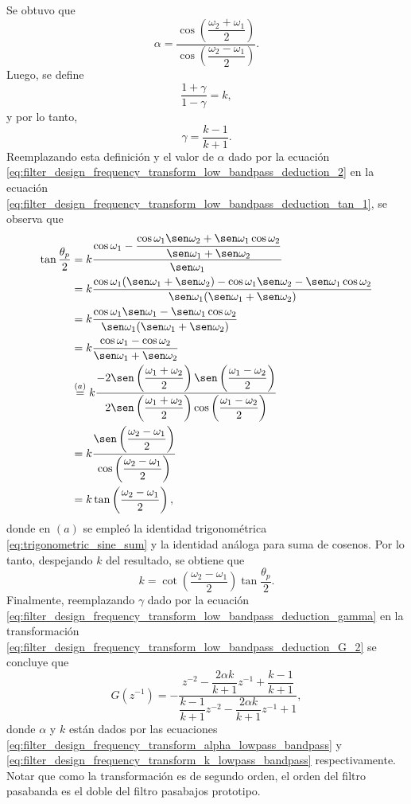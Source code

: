 \documentclass[a4paper]{report}
\begin{document}
Se obtuvo que
\begin{equation}\label{eq:filter_design_frequency_transform_alpha_lowpass_bandpass}
 \alpha=\dfrac{\cos\left(\dfrac{\omega_2+\omega_1}{2}\right)}{\cos\left(\dfrac{\omega_2-\omega_1}{2}\right)}. 
\end{equation}
Luego, se define
\[
 \frac{1+\gamma}{1-\gamma}=k,
\]
y por lo tanto,
\begin{equation}\label{eq:filter_design_frequency_transform_low_bandpass_deduction_gamma}
 \gamma=\frac{k-1}{k+1}. 
\end{equation}
Reemplazando esta definición y el valor de \(\alpha\) dado por la ecuación \ref{eq:filter_design_frequency_transform_low_bandpass_deduction_2} en la ecuación \ref{eq:filter_design_frequency_transform_low_bandpass_deduction_tan_1}, se observa que
\begin{align*}
 \tan\frac{\theta_p}{2}&=k\dfrac{\cos\omega_1-\dfrac{\cos\omega_1\sen\omega_2+\sen\omega_1\cos\omega_2}{\sen\omega_1+\sen\omega_2}}{\sen\omega_1}\\ 
  &=k\dfrac{\cos\omega_1(\sen\omega_1+\sen\omega_2)-\cos\omega_1\sen\omega_2-\sen\omega_1\cos\omega_2}{\sen\omega_1(\sen\omega_1+\sen\omega_2)}\\ 
  &=k\dfrac{\cos\omega_1\sen\omega_1-\sen\omega_1\cos\omega_2}{\sen\omega_1(\sen\omega_1+\sen\omega_2)}\\
  &=k\dfrac{\cos\omega_1-\cos\omega_2}{\sen\omega_1+\sen\omega_2}\\
  &\overset{(a)}{=}k\dfrac{-2\sen\left(\dfrac{\omega_1+\omega_2}{2}\right)\sen\left(\dfrac{\omega_1-\omega_2}{2}\right)}{2\sen\left(\dfrac{\omega_1+\omega_2}{2}\right)\cos\left(\dfrac{\omega_1-\omega_2}{2}\right)}\\
  &=k\dfrac{\sen\left(\dfrac{\omega_2-\omega_1}{2}\right)}{\cos\left(\dfrac{\omega_2-\omega_1}{2}\right)}\\
  &=k\tan\left(\dfrac{\omega_2-\omega_1}{2}\right),
\end{align*} 
donde en \((a)\) se empleó la identidad trigonométrica \ref{eq:trigonometric_sine_sum} y la identidad análoga para suma de cosenos. Por lo tanto, despejando \(k\) del resultado, se obtiene que
\begin{equation}\label{eq:filter_design_frequency_transform_k_lowpass_bandpass}
 k=\cot\left(\dfrac{\omega_2-\omega_1}{2}\right)\tan\frac{\theta_p}{2}.
\end{equation}
Finalmente, reemplazando \(\gamma\) dado por la ecuación \ref{eq:filter_design_frequency_transform_low_bandpass_deduction_gamma} en la transformación
\ref{eq:filter_design_frequency_transform_low_bandpass_deduction_G_2} se concluye que 
\begin{equation}\label{eq:filter_design_frequency_transform_G_lowpass_bandpass}
 G(z^{-1})=-\dfrac{z^{-2}-\dfrac{2\alpha k}{k+1}z^{-1}+\dfrac{k-1}{k+1}}{\dfrac{k-1}{k+1}z^{-2}-\dfrac{2\alpha k}{k+1}z^{-1}+1},  
\end{equation}
donde \(\alpha\) y \(k\) están dados por las ecuaciones \ref{eq:filter_design_frequency_transform_alpha_lowpass_bandpass} y \ref{eq:filter_design_frequency_transform_k_lowpass_bandpass} respectivamente. Notar que como la transformación es de segundo orden, el orden del filtro pasabanda es el doble del filtro pasabajos prototipo.
 
\end{document}
